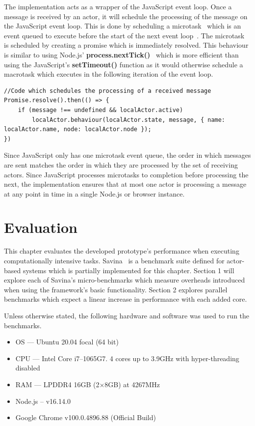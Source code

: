 \documentclass[oneside]{um-fict}
\begin{document}
The implementation acts as a wrapper of the JavaScript event loop. Once a message is received by an actor, it will schedule the processing of the message on the JavaScript event loop. This is done by scheduling a microtask~\cite{microtasks} which is an event queued to execute before the start of the next event loop~\cite{eventloopbrowser}\cite{eventloopnode}. The microtask is scheduled by creating a promise which is immediately resolved. This behaviour is similar to using Node.js' \textbf{process.nextTick()}~\cite{nexttick} which is more efficient than using the JavaScript's \textbf{setTimeout()} function as it would otherwise schedule a macrotask which executes in the following iteration of the event loop.
\begin{lstlisting}
//Code which schedules the processing of a received message
Promise.resolve().then(() => {
    if (message !== undefined && localActor.active)
        localActor.behaviour(localActor.state, message, { name: localActor.name, node: localActor.node });
})
\end{lstlisting}

Since JavaScript only has one microtask event queue, the order in which messages are sent matches the order in which they are processed by the set of receiving actors. Since JavaScript processes microtasks to completion before processing the next, the implementation ensures that at most one actor is processing a message at any point in time in a single Node.js or browser instance.

\chapter{Evaluation}
This chapter evaluates the developed prototype's performance when executing computationally intensive tasks. Savina~\cite{savina} is a benchmark suite defined for actor-based systems which is partially implemented for this chapter. Section 1 will explore each of Savina's micro-benchmarks which measure overheads introduced when using the framework's basic functionality. Section 2 explores parallel benchmarks which expect a linear increase in performance with each added core. 

Unless otherwise stated, the following hardware and software was used to run the benchmarks.
\begin{itemize}
    \item OS --- Ubuntu 20.04 focal (64 bit)
    \item CPU --- Intel Core i7--1065G7. 4 cores up to 3.9GHz with hyper-threading disabled
    \item RAM --- LPDDR4 16GB (2$\times$8GB) at 4267MHz
    \item Node.js – v16.14.0
    \item Google Chrome v100.0.4896.88 (Official Build)
\end{itemize}
\end{document}

